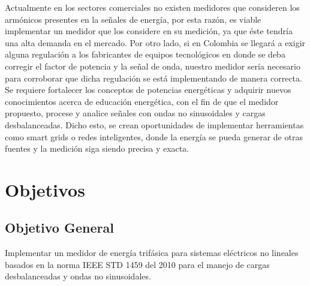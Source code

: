 Actualmente en los sectores comerciales no existen medidores que consideren los armónicos presentes en la señales de energía, por esta razón, es viable implementar un medidor que los considere en su medición, ya que éste tendría una alta demanda en el mercado. Por otro lado, si en Colombia se llegará a exigir alguna regulación a los fabricantes de equipos tecnológicos en donde se deba corregir el factor de potencia y la señal de onda, nuestro medidor sería necesario para corroborar que dicha regulación se está implementando de manera correcta. \\

Se requiere fortalecer los conceptos de potencias energéticas y adquirir nuevos conocimientos acerca de educación energética, con el fin de que el medidor propuesto, procese y analice señales con ondas no sinusoidales y cargas desbalanceadas. Dicho esto, se crean oportunidades de implementar herramientas como smart grids o redes inteligentes, donde la energía se pueda generar de otras fuentes y la medición siga siendo precisa y exacta.


\newpage{\clearpage}
\chapter{ Objetivos}
\section{Objetivo General}

Implementar un medidor de energía trifásica para sistemas eléctricos no lineales basados en la norma IEEE STD 1459 del 2010 para el manejo de cargas desbalanceadas y ondas no sinusoidales.

